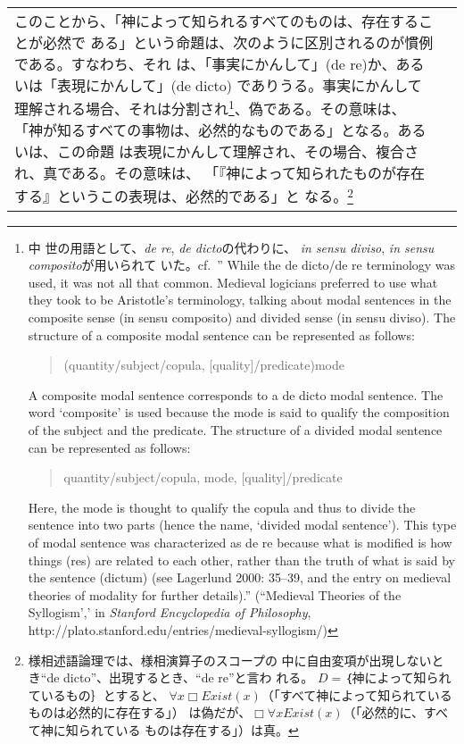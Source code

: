 \documentclass[10pt]{jsarticle} %
\begin{document}
\begin{longtable}{p{21em}p{21em}}
このことから、「神によって知られるすべてのものは、存在することが必然で
ある」という命題は、次のように区別されるのが慣例である。すなわち、それ
は、「事実にかんして」(de re)か、あるいは「表現にかんして」(de dicto)
でありうる。事実にかんして理解される場合、それは分割され\footnote {中
世の用語として、{\itshape de re}, {\itshape de dicto}の代わりに、
{\itshape in sensu diviso}, {\itshape in sensu composito}が用いられて
いた。cf.~'' While the de dicto/de re terminology was used, it was not
all that common. Medieval logicians preferred to use what they took to
be Aristotle's terminology, talking about modal sentences in the
composite sense (in sensu composito) and divided sense (in sensu
diviso). The structure of a composite modal sentence can be
represented as follows:
\begin{quote}
    (quantity/subject/copula, [quality]/predicate)mode
\end{quote}
 A composite modal sentence corresponds to a de dicto modal sentence. The word ‘composite’ is used because the mode is said to qualify the composition of the subject and the predicate. The structure of a divided modal sentence can be represented as follows:
\begin{quote}
quantity/subject/copula, mode, [quality]/predicate
\end{quote}
Here, the mode is thought to qualify the copula and thus to divide the sentence into two parts (hence the name, ‘divided modal sentence’). This type of modal sentence was characterized as de re because what is modified is how things (res) are related to each other, rather than the truth of what is said by the sentence (dictum) (see Lagerlund 2000: 35–39, and the entry on medieval theories of modality for further details).'' (``Medieval Theories of the Syllogism',' in {\itshape Stanford Encyclopedia of Philosophy}, http://plato.stanford.edu/entries/medieval-syllogism/)
}、偽である。その意味は、
 「神が知るすべての事物は、必然的なものである」となる。あるいは、この命題
 は表現にかんして理解され、その場合、複合され、真である。その意味は、
 「『神によって知られたものが存在する』というこの表現は、必然的である」と
 なる。\footnote{様相述語論理では、様相演算子のスコープの
 中に自由変項が出現しないとき``de dicto''、出現するとき、``de re''と言わ
 れる。
$D = $｛神によって知られているもの｝とすると、
$\forall x \Box Exist(x)$（「すべて神によって知られているものは必然的に存在する」）
 は偽だが、$\Box \forall x Exist(x)$（「必然的に、すべて神に知られている
 ものは存在する」）は真。
}


\\


\end{longtable}
\end{document}

